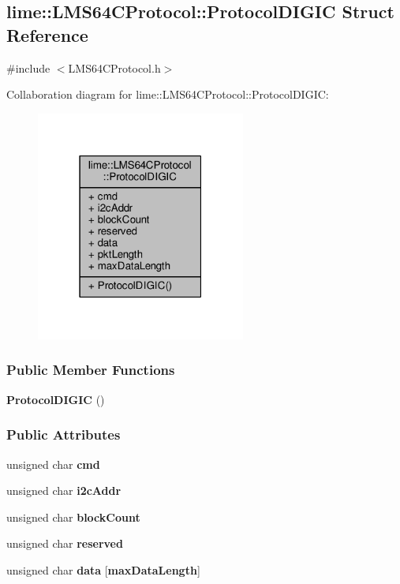 \subsection{lime\+:\+:L\+M\+S64\+C\+Protocol\+:\+:Protocol\+D\+I\+G\+IC Struct Reference}
\label{structlime_1_1LMS64CProtocol_1_1ProtocolDIGIC}


{\ttfamily \#include $<$L\+M\+S64\+C\+Protocol.\+h$>$}



Collaboration diagram for lime\+:\+:L\+M\+S64\+C\+Protocol\+:\+:Protocol\+D\+I\+G\+IC\+:
\nopagebreak
\begin{figure}[H]
\begin{center}
\leavevmode
\includegraphics[width=195pt]{d3/db3/structlime_1_1LMS64CProtocol_1_1ProtocolDIGIC__coll__graph}
\end{center}
\end{figure}
\subsubsection*{Public Member Functions}
\begin{DoxyCompactItemize}
\item 
{\bf Protocol\+D\+I\+G\+IC} ()
\end{DoxyCompactItemize}
\subsubsection*{Public Attributes}
\begin{DoxyCompactItemize}
\item 
unsigned char {\bf cmd}
\item 
unsigned char {\bf i2c\+Addr}
\item 
unsigned char {\bf block\+Count}
\item 
unsigned char {\bf reserved}
\item 
unsigned char {\bf data} [{\bf max\+Data\+Length}]
\end{DoxyCompactItemize}

